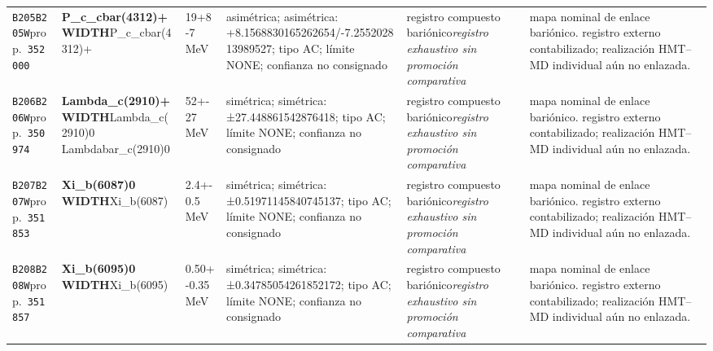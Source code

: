 \begin{landscape}
\begin{longtable}{L{1.85cm}L{4.45cm}L{2.35cm}L{4.05cm}L{3.35cm}L{7.15cm}}
\texttt{B205}\newline \texttt{B205W}\newline prop.\ \texttt{352000} & \textbf{P\_\allowbreak{}c\_\allowbreak{}cbar(4312)+ WIDTH}\newline P\_\allowbreak{}c\_\allowbreak{}cbar(4312)+ & 19+8-7\,MeV & asimétrica; asimétrica: +8.1568830165262654/-7.255202813989527; tipo AC; límite NONE; confianza no consignado & registro compuesto bariónico\newline \emph{registro exhaustivo sin promoción comparativa} & mapa nominal de enlace bariónico. registro externo contabilizado; realización HMT--MD individual aún no enlazada. \\
\texttt{B206}\newline \texttt{B206W}\newline prop.\ \texttt{350974} & \textbf{Lambda\_\allowbreak{}c(2910)+ WIDTH}\newline Lambda\_\allowbreak{}c(2910)0 \textbar{}\allowbreak{} Lambdabar\_\allowbreak{}c(2910)0 & 52+-27\,MeV & simétrica; simétrica: ±27.448861542876418; tipo AC; límite NONE; confianza no consignado & registro compuesto bariónico\newline \emph{registro exhaustivo sin promoción comparativa} & mapa nominal de enlace bariónico. registro externo contabilizado; realización HMT--MD individual aún no enlazada. \\
\texttt{B207}\newline \texttt{B207W}\newline prop.\ \texttt{351853} & \textbf{Xi\_\allowbreak{}b(6087)0 WIDTH}\newline Xi\_\allowbreak{}b(6087) & 2.4+-0.5\,MeV & simétrica; simétrica: ±0.51971145840745137; tipo AC; límite NONE; confianza no consignado & registro compuesto bariónico\newline \emph{registro exhaustivo sin promoción comparativa} & mapa nominal de enlace bariónico. registro externo contabilizado; realización HMT--MD individual aún no enlazada. \\
\texttt{B208}\newline \texttt{B208W}\newline prop.\ \texttt{351857} & \textbf{Xi\_\allowbreak{}b(6095)0 WIDTH}\newline Xi\_\allowbreak{}b(6095) & 0.50+-0.35\,MeV & simétrica; simétrica: ±0.34785054261852172; tipo AC; límite NONE; confianza no consignado & registro compuesto bariónico\newline \emph{registro exhaustivo sin promoción comparativa} & mapa nominal de enlace bariónico. registro externo contabilizado; realización HMT--MD individual aún no enlazada. \\

\end{longtable}
\end{landscape}
